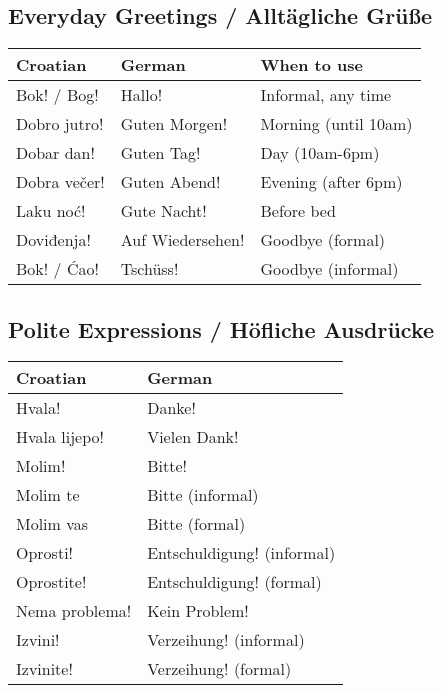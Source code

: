 \begin{vocabulary}
\subsection*{Everyday Greetings / Alltägliche Grüße}

\begin{center}
\begin{tabular}{lll}
\toprule
Croatian & German & When to use \\
\midrule
Bok! / Bog! & Hallo! & Informal, any time \\
Dobro jutro! & Guten Morgen! & Morning (until 10am) \\
Dobar dan! & Guten Tag! & Day (10am-6pm) \\
Dobra večer! & Guten Abend! & Evening (after 6pm) \\
Laku noć! & Gute Nacht! & Before bed \\
Doviđenja! & Auf Wiedersehen! & Goodbye (formal) \\
Bok! / Ćao! & Tschüss! & Goodbye (informal) \\
\bottomrule
\end{tabular}
\end{center}

\subsection*{Polite Expressions / Höfliche Ausdrücke}

\begin{center}
\begin{tabular}{ll}
\toprule
Croatian & German \\
\midrule
Hvala! & Danke! \\
Hvala lijepo! & Vielen Dank! \\
Molim! & Bitte! \\
Molim te & Bitte (informal) \\
Molim vas & Bitte (formal) \\
Oprosti! & Entschuldigung! (informal) \\
Oprostite! & Entschuldigung! (formal) \\
Nema problema! & Kein Problem! \\
Izvini! & Verzeihung! (informal) \\
Izvinite! & Verzeihung! (formal) \\
\bottomrule
\end{tabular}
\end{center}


\end{vocabulary}
